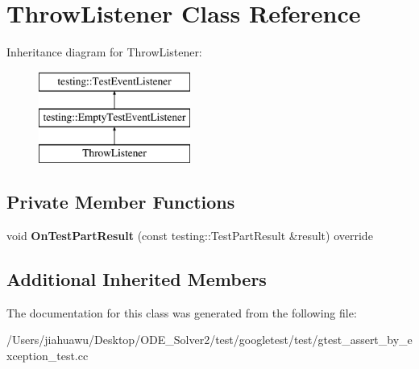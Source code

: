 \hypertarget{class_throw_listener}{}\section{Throw\+Listener Class Reference}
\label{class_throw_listener}
Inheritance diagram for Throw\+Listener\+:\begin{figure}[H]
\begin{center}
\leavevmode
\includegraphics[height=3.000000cm]{class_throw_listener}
\end{center}
\end{figure}
\subsection*{Private Member Functions}
\begin{DoxyCompactItemize}
\item 
\mbox{\label{class_throw_listener_a7756195364cd836b096cd107d46d5ae8}} 
void {\bfseries On\+Test\+Part\+Result} (const testing\+::\+Test\+Part\+Result \&result) override
\end{DoxyCompactItemize}
\subsection*{Additional Inherited Members}


The documentation for this class was generated from the following file\+:\begin{DoxyCompactItemize}
\item 
/\+Users/jiahuawu/\+Desktop/\+O\+D\+E\+\_\+\+Solver2/test/googletest/test/gtest\+\_\+assert\+\_\+by\+\_\+exception\+\_\+test.\+cc\end{DoxyCompactItemize}
